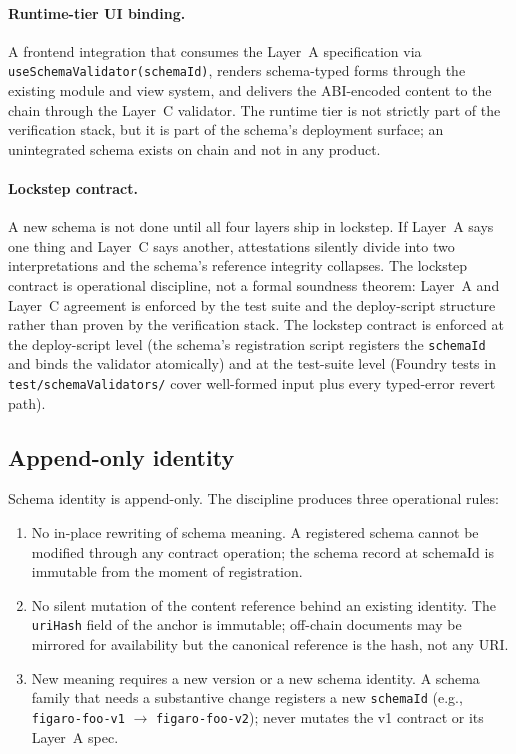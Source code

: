 \documentclass[11pt,a4paper]{article}
\theoremstyle{definition}
\theoremstyle{remark}
\newcommand{\schemaid}{\mathrm{schemaId}}
\begin{document}
\paragraph{Runtime-tier UI binding.}
A frontend integration that consumes the Layer~A specification via
\texttt{useSchemaValidator(schemaId)}, renders schema-typed forms
through the existing module and view system, and delivers the
ABI-encoded content to the chain through the Layer~C validator. The
runtime tier is not strictly part of the verification stack, but it
is part of the schema's deployment surface; an unintegrated schema
exists on chain and not in any product.

\paragraph{Lockstep contract.}
A new schema is not done until all four layers ship in lockstep. If
Layer~A says one thing and Layer~C says another, attestations
silently divide into two interpretations and the schema's reference
integrity collapses. The lockstep contract is operational discipline,
not a formal soundness theorem: Layer~A and Layer~C agreement is
enforced by the test suite and the deploy-script structure rather
than proven by the verification stack. The lockstep contract is
enforced at the deploy-script level (the schema's registration script
registers the \texttt{schemaId} and binds the validator atomically)
and at the
test-suite level (Foundry tests in \texttt{test/schemaValidators/}
cover well-formed input plus every typed-error revert path).

\subsection{Append-only identity}
\label{sec:append-only}

Schema identity is append-only. The discipline produces three
operational rules:

\begin{enumerate}
  \item No in-place rewriting of schema meaning. A registered schema
    cannot be modified through any contract operation; the schema
    record at $\schemaid$ is immutable from the moment of
    registration.
  \item No silent mutation of the content reference behind an
    existing identity. The \texttt{uriHash} field of the anchor is
    immutable; off-chain documents may be mirrored for availability
    but the canonical reference is the hash, not any URI.
  \item New meaning requires a new version or a new schema identity.
    A schema family that needs a substantive change registers a new
    \texttt{schemaId} (e.g., \texttt{figaro-foo-v1} $\to$
    \texttt{figaro-foo-v2}); never mutates the v1 contract or its
    Layer~A spec.
\end{enumerate}
\end{document}
